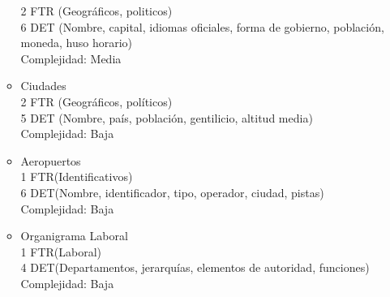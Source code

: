 \begin{enumerate}
\begin{itemize}
			2 FTR (Geográficos, politicos) \\
			6 DET (Nombre, capital, idiomas oficiales, forma de gobierno, población, moneda, huso horario) \\
			Complejidad: Media\\	
		\item Ciudades \\
			2 FTR (Geográficos, políticos) \\
			5 DET (Nombre, país, población, gentilicio, altitud media) \\
			Complejidad: Baja\\
		\item Aeropuertos \\
			1 FTR(Identificativos) \\
			6 DET(Nombre, identificador, tipo, operador, ciudad, pistas) \\
			Complejidad: Baja\\
		\item Organigrama Laboral \\
			1 FTR(Laboral) \\
			4 DET(Departamentos, jerarquías, elementos de autoridad, funciones) \\
			Complejidad: Baja\\	
	\end{itemize}		
\end{enumerate}
